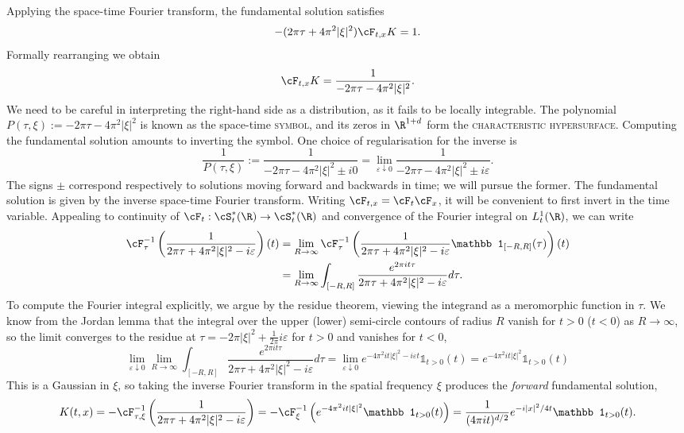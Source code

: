 \documentclass[reqno]{amsart}
\theoremstyle{definition}
\theoremstyle{remark}
\renewcommand{\epsilon}{\varepsilon}
\renewcommand{\emph}{\textsc}
\begin{document}
Applying the space-time Fourier transform, the fundamental solution satisfies
	\[ -(2\pi \tau + 4\pi^2 |\xi|^2) \cF_{t, x} K = 1. \]
Formally rearranging we obtain
	\[  \cF_{t, x} K = \frac{1}{-2\pi \tau - 4\pi^2 |\xi|^2}. \]	
We need to be careful in interpreting the right-hand side as a distribution, as it fails to be locally integrable. 
The polynomial $P(\tau, \xi) := -2\pi \tau - 4\pi^2 |\xi|^2$ is known as the space-time \emph{symbol}, and its zeros in $\R^{1 + d}$ form the \emph{characteristic hypersurface}. Computing the fundamental solution amounts to inverting the symbol. One choice of regularisation for the inverse is
	\[ \frac{1}{P(\tau, \xi)} := \frac{1}{- 2\pi \tau - 4\pi^2 |\xi|^2 \pm i 0} = \lim_{\epsilon \downarrow 0}\frac{1}{-2\pi \tau - 4\pi^2 |\xi|^2 \pm  i \epsilon}. \]
The signs $\pm$ correspond respectively to solutions moving forward and backwards in time; we will pursue the former. The fundamental solution is given by the inverse space-time Fourier transform. Writing $\cF_{t, x} = \cF_t \cF_x$, it will be convenient to first invert in the time variable. Appealing to continuity of $\cF_t : \cS^*_t (\R) \to \cS^*_t (\R)$ and convergence of the Fourier integral on $L^1_t (\R)$, we can write
	\begin{align*}
		\cF^{-1}_\tau \left(\frac{1}{2\pi \tau + 4\pi^2 |\xi|^2 - i \epsilon} \right)(t) 
			&=
		\lim_{R \to \infty} \cF^{-1}_\tau \left( \frac{1}{2\pi  \tau + 4\pi^2 |\xi|^2 - i \epsilon} \mathbb 1_{[-R, R]} (\tau) \right) (t) \\
			&=			
			\lim_{R \to \infty} \int_{[-R, R]} \frac{e^{2\pi i t \tau}}{2\pi \tau + 4\pi^2 |\xi|^2 - i \epsilon} d \tau.
		\end{align*} 	
	To compute the Fourier integral explicitly, we argue by the residue theorem, viewing the integrand as a meromorphic function in $\tau$. We know from the Jordan lemma that the integral over the upper (lower) semi-circle contours of radius $R$ vanish for $t > 0$ ($t < 0$) as $R \to \infty$, so the limit converges to the residue at $\tau = - 2\pi |\xi|^2 + \tfrac{1}{2\pi}i \epsilon$ for $t > 0$ and vanishes for $t < 0$,
		\[ \lim_{\epsilon \downarrow 0}\lim_{R \to \infty} \int_{[-R, R]} \frac{e^{2\pi i t \tau}}{2\pi \tau + 4\pi^2 |\xi|^2 - i \epsilon} d \tau = \lim_{\epsilon \downarrow 0}  e^{- 4\pi^2 i t |\xi|^2 - i \epsilon t} \mathbb 1_{t > 0} (t) = e^{- 4\pi^2 i t |\xi|^2} \mathbb 1_{t > 0} (t)\]
	This is a Gaussian in $\xi$, so taking the inverse Fourier transform in the spatial frequency $\xi$ produces the \textit{forward} fundamental solution, 
	\[ K(t, x) = -\cF^{-1}_{\tau, \xi}\left( \frac{1}{2\pi \tau + 4\pi^2 |\xi|^2 - i \epsilon} \right) = - \cF_{\xi}^{-1}\left(  e^{- 4\pi^2 i t |\xi|^2} \mathbb 1_{t > 0} (t) \right)   = \frac{1}{(4\pi i t)^{d/2}} e^{-i |x|^2/4t} \mathbb 1_{t > 0} (t). \]
\end{document}
